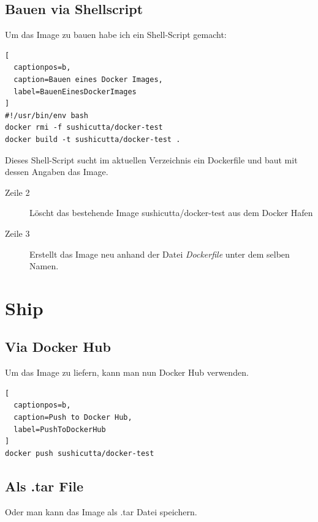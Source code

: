 \subsection{Bauen via Shellscript}

Um das Image zu bauen habe ich ein Shell-Script gemacht:
\\

\begin{lstlisting}[
  captionpos=b,
  caption=Bauen eines Docker Images,
  label=BauenEinesDockerImages
]
#!/usr/bin/env bash
docker rmi -f sushicutta/docker-test
docker build -t sushicutta/docker-test .
\end{lstlisting}

Dieses Shell-Script sucht im aktuellen Verzeichnis ein Dockerfile und baut mit dessen
Angaben das Image.

\begin{description}

\item[Zeile 2] Löscht das bestehende Image sushicutta/docker-test aus dem Docker Hafen

\item[Zeile 3] Erstellt das Image neu anhand der Datei \textit{Dockerfile} unter dem selben Namen.

\end{description}

\section{Ship}

\subsection{Via Docker Hub}

Um das Image zu liefern, kann man nun Docker Hub verwenden.
\\

\begin{lstlisting}[
  captionpos=b,
  caption=Push to Docker Hub,
  label=PushToDockerHub
]
docker push sushicutta/docker-test
\end{lstlisting}

\subsection{Als .tar File}

Oder man kann das Image als .tar Datei speichern.
\\

